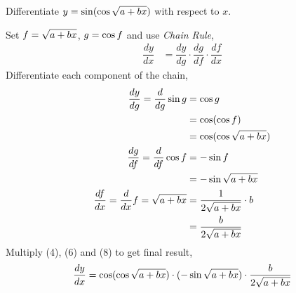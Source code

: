 

\question[4] Differentiate $y=\sin(\cos\sqrt{a+bx})$ with respect to $x$.

\watchout

\begin{solution}[\halfpage]
  Set $f=\sqrt{a+bx}$, $g=\cos f$ and use \textit{Chain Rule},
  \begin{align}
    \dfrac{dy}{dx} &= \dfrac{dy}{dg}\cdot\dfrac{dg}{df}\cdot\dfrac{df}{dx}
  \end{align}
  Differentiate each component of the chain,
  \begin{align}
    \dfrac{dy}{dg}=\dfrac{d}{dg} \sin g
                 &=\cos g \\
                 &=\cos(\cos f) \\
                 &=\cos(\cos \sqrt{a+bx}) \\
    \dfrac{dg}{df}=\dfrac{d}{df} \cos f
                 &=-\sin f \\
                 &=-\sin \sqrt{a+bx} \\
    \dfrac{df}{dx}=\dfrac{d}{dx}f=\sqrt{a+bx}
                 &=\dfrac{1}{2\sqrt{a+bx}}\cdot b \\
                 &=\dfrac{b}{2\sqrt{a+bx}}
  \end{align}
  Multiply (4), (6) and (8) to get final result,
  \begin{align}
    \dfrac{dy}{dx}=\cos(\cos \sqrt{a+bx})\cdot 
                   (-\sin \sqrt{a+bx})\cdot
                   \dfrac{b}{2\sqrt{a+bx}}
  \end{align}
\end{solution}

